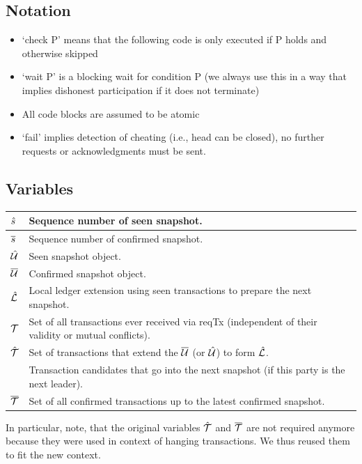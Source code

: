 \subsection{Notation}
\begin{itemize}
  \item ‘check P’ means that the following code is only executed if P holds and
        otherwise skipped
  \item ‘wait P’ is a blocking wait for condition P (we always use this in a way
        that implies dishonest participation if it does not terminate)
  \item All code blocks are assumed to be atomic
  \item ‘fail’ implies detection of cheating (i.e., head can be closed), no
        further requests or acknowledgments must be sent.
\end{itemize}



\subsection{Variables}

\begin{center}
\begin{tabular}{|l|l|}\hline
  $\hat s$  & Sequence number of seen snapshot. \\ \hline
  $\overline s$  & Sequence number of confirmed snapshot. \\ \hline
  $\hat {\mathcal U}$ & Seen snapshot object. \\ \hline
  $\overline {\mathcal U}$ & Confirmed snapshot object. \\ \hline
  $\hat {\mathcal L}$ & Local ledger extension using seen transactions to prepare the next snapshot.\\ \hline
  ${\mathcal T}$    & Set of all transactions ever received via reqTx (independent of their validity or mutual conflicts).\\  \hline
  $\hat {\mathcal T}$ & Set of transactions that extend the $\overline {\mathcal U}$ (or $\hat {\mathcal U}$) to form $\hat {\mathcal L}$. \\
           & Transaction candidates that go into the next snapshot (if this party is the next leader).\\ \hline
  $\overline {\mathcal T}$ & Set of all confirmed transactions up to the latest confirmed snapshot.\\  \hline
\end{tabular}
\end{center}

In particular, note, that the original variables $\hat {\mathcal T}$ and $\overline {\mathcal T}$ are not required anymore because they
were used in context of hanging transactions. We thus reused them to fit the new context.

